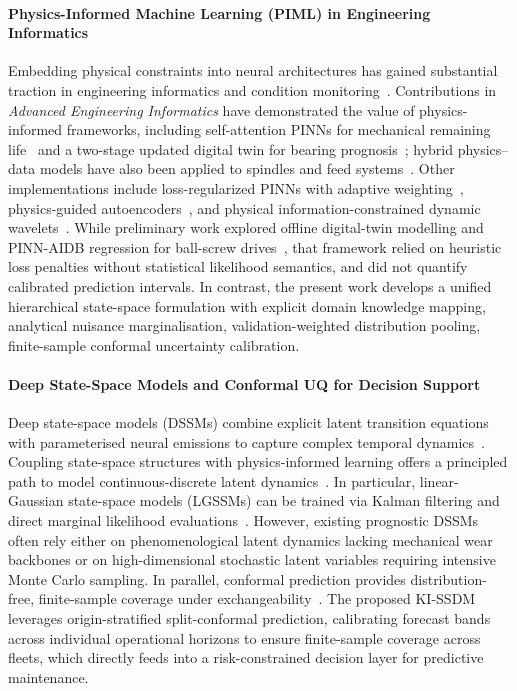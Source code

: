\documentclass[a4paper,fleqn]{cas-dc}
\begin{document}
\paragraph{Physics-Informed Machine Learning (PIML) in Engineering Informatics}
Embedding physical constraints into neural architectures has gained substantial traction in engineering informatics and condition monitoring~\cite{Wu_2024, Xu_2023, Yan_2026, Lai_2024}. Contributions in \emph{Advanced Engineering Informatics} have demonstrated the value of physics-informed frameworks, including self-attention PINNs for mechanical remaining life~\cite{Liao_2023} and a two-stage updated digital twin for bearing prognosis~\cite{D_He_2025}; hybrid physics--data models have also been applied to spindles and feed systems~\cite{Tai_2023, Zhang_2025, Yuan_2024}. Other implementations include loss-regularized PINNs with adaptive weighting~\cite{Yan_2026, P_Zhang_2026}, physics-guided autoencoders~\cite{Lai_2024}, and physical information-constrained dynamic wavelets~\cite{Zhao_2026}. While preliminary work explored offline digital-twin modelling and PINN-AIDB regression for ball-screw drives~\cite{PriorWork_MSSP_2026}, that framework relied on heuristic loss penalties without statistical likelihood semantics,  and did not quantify calibrated prediction intervals. In contrast, the present work develops a unified hierarchical state-space formulation with explicit domain knowledge mapping, analytical nuisance marginalisation, validation-weighted distribution pooling, finite-sample conformal uncertainty calibration.

\paragraph{Deep State-Space Models and Conformal UQ for Decision Support}
Deep state-space models (DSSMs) combine explicit latent transition equations with parameterised neural emissions to capture complex temporal dynamics~\cite{Marco_2026, Jiaxin_2025}. Coupling state-space structures with physics-informed learning offers a principled path to model continuous-discrete latent dynamics~\cite{Arnold_2021}. In particular, linear-Gaussian state-space models (LGSSMs) can be trained via Kalman filtering and direct marginal likelihood evaluations~\cite{Marco_2026}. However, existing prognostic DSSMs often rely either on phenomenological latent dynamics lacking mechanical wear backbones or on high-dimensional stochastic latent variables requiring intensive Monte Carlo sampling. In parallel, conformal prediction provides distribution-free, finite-sample coverage under exchangeability~\cite{Vovk_2022, Lei_2018_CP, Angelopoulos_2023, Zhang_CP_2025}. The proposed KI-SSDM leverages origin-stratified split-conformal prediction, calibrating forecast bands across individual operational horizons to ensure finite-sample coverage across fleets, which directly feeds into a risk-constrained decision layer for predictive maintenance.
\end{document}
